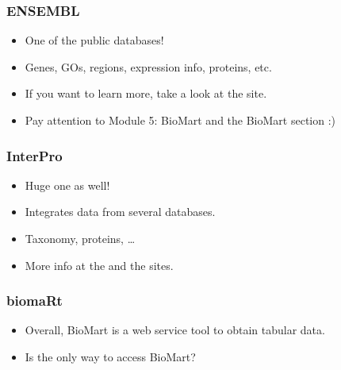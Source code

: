 \begin{frame}[allowframebreaks]
  \frametitle{ENSEMBL}
  \begin{itemize}
  \item One of the  public databases!
  \item Genes, GOs, regions, expression info, proteins, etc.
  \item If you want to learn more, take a look at the  site.
  \item Pay attention to Module 5: BioMart and the BioMart section :)
  \end{itemize}
\end{frame}

\begin{frame}[allowframebreaks]
  \frametitle{InterPro}
  \begin{itemize}
  \item \alert{Huge} one as well!
  \item Integrates data from several databases.
  \item Taxonomy, proteins, \ldots
  \item More info at the  and the  sites.
  \end{itemize}
\end{frame}

\begin{frame}[allowframebreaks]
  \frametitle{biomaRt}
  \begin{itemize}
  \item Overall, BioMart is a web service tool to obtain tabular data.
  \item Is  the only way to access BioMart?
  \end{itemize}
\end{frame}

